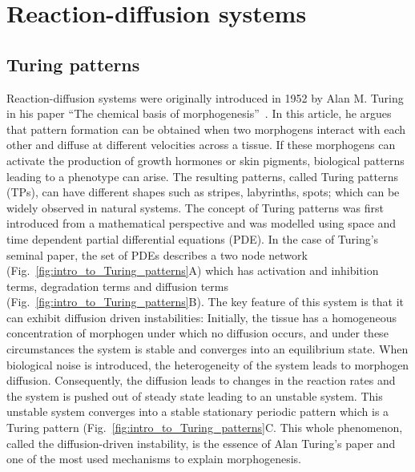 \section{Reaction-diffusion systems}
\subsection{Turing patterns}
Reaction-diffusion systems were originally introduced in 1952 by Alan M. Turing in his paper “The chemical basis of morphogenesis”~\parencite{Turing1952}.
In this article, he argues that pattern formation can be obtained when two morphogens interact with each other and diffuse at different
velocities across a tissue.
If these morphogens can activate the production of growth hormones or skin pigments, biological patterns leading to a phenotype can arise.
The resulting patterns, called Turing patterns (TPs), can have different shapes such as stripes, labyrinths, spots; which can be widely observed in natural systems.
The concept of Turing patterns was first introduced from a mathematical perspective and was modelled using space and time dependent partial differential equations (PDE). In the case of Turing’s seminal paper, the set of PDEs describes a two node network (Fig.~\ref{fig:intro_to_Turing_patterns}A) which has activation and inhibition terms, degradation terms and diffusion terms (Fig.~\ref{fig:intro_to_Turing_patterns}B).
The key feature of this system is that it can exhibit diffusion driven instabilities: Initially, the tissue has a homogeneous concentration of morphogen under which no diffusion occurs, and under these circumstances the system is stable and converges into an equilibrium state.
When biological noise is introduced, the heterogeneity of the system leads to morphogen diffusion.
Consequently, the diffusion leads to changes in the reaction rates and the system is pushed out of steady state leading to an unstable system.
This unstable system converges into a stable stationary periodic pattern which is a Turing pattern (Fig.~\ref{fig:intro_to_Turing_patterns}C.
This whole phenomenon, called the diffusion-driven instability, is the essence of Alan Turing’s paper and one of the most used mechanisms to explain morphogenesis.

